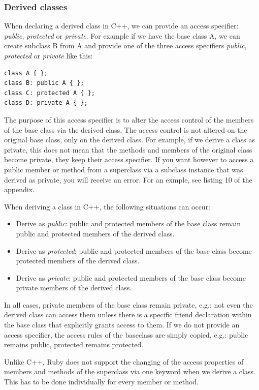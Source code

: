 \documentclass[10pt,a4paper,twocolumn]{article}
\begin{document}
\subsubsection{Derived classes}
When declaring a derived class in C++, we can provide an access specifier: \textit{public}, \textit{protected} or \textit{private}. For example if we have the base class A, we can create subclass B from A and provide one of the three access specifiers \textit{public}, \textit{protected} or \textit{private} like this:

\begin{lstlisting}
class A { };
class B: public A { };
class C: protected A { };
class D: private A { };
\end{lstlisting}

The purpose of this access specifier is to alter the access control of the members of the base class via the derived class. The access control is not altered on the original base class, only on the derived class. For example, if we derive a class as private, this does not mean that the methods and members of the original class become private, they keep their access specifier. If you want however to access a public member or method from a superclass via a subclass instance that was derived as private, you will receive an error. For an exmple, see listing 10 of the appendix.

When deriving a class in C++, the following situations can occur:
\begin{itemize}
\item Derive as \textit{public}: public and protected members of the base class remain public and protected members of the derived class.
\item Derive as \textit{protected}: public and protected members of the base class become protected members of the derived class.
\item Derive as \textit{private}: public and protected members of the base class become private members of the derived class.
\end{itemize}

In all cases, private members of the base class remain private, e.g.: not even the derived class can access them unless there is a specific friend declaration within the base class that explicitly grants access to them. If we do not provide an access specifier, the access rules of the baseclass are simply copied, e.g.: public remains public, protected remains protected.

Unlike C++, Ruby does not support the changing of the access properties of members and methods of the superclass via one keyword when we derive a class. This has to be done individually for every member or method.
\end{document}

